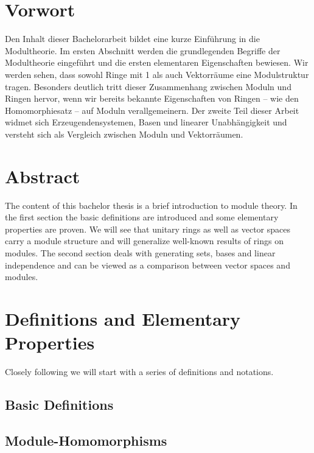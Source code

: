 \newpage

\thispagestyle{empty}

\renewcommand{\thepage}{}

\section*{Vorwort}
Den Inhalt dieser Bachelorarbeit bildet eine kurze Einf\"uhrung in die Modultheorie. Im ersten Abschnitt werden die grundlegenden Begriffe der Modultheorie eingef\"uhrt und die ersten elementaren Eigenschaften bewiesen. Wir werden sehen, dass sowohl Ringe mit 1 als auch Vektorr\"aume eine Modulstruktur tragen. Besonders deutlich tritt dieser Zusammenhang zwischen Moduln und Ringen hervor, wenn wir bereits bekannte Eigenschaften von Ringen -- wie den Homomorphiesatz -- auf Moduln verallgemeinern. Der zweite Teil dieser Arbeit widmet sich Erzeugendensystemen, Basen und linearer Unabh\"angigkeit und versteht sich als Vergleich zwischen Moduln und Vektorr\"aumen. 
\vspace{1.5cm}
\section*{Abstract}
The content of this bachelor thesis is a brief introduction to module theory. In the first section the basic definitions are introduced and some elementary properties are proven. We will see that unitary rings as well as vector spaces carry a module structure and will generalize well-known results of rings on modules. The second section deals with generating sets, bases and linear independence and can be viewed as a comparison between vector spaces and modules.

\newpage

\section{Definitions and Elementary Properties}

	Closely following \cite[Chap.VII]{jantzen2005algebra} we will start with a series of definitions and notations.
	
	\subsection{Basic Definitions}
	
		

	\subsection{Module-Homomorphisms}
		
